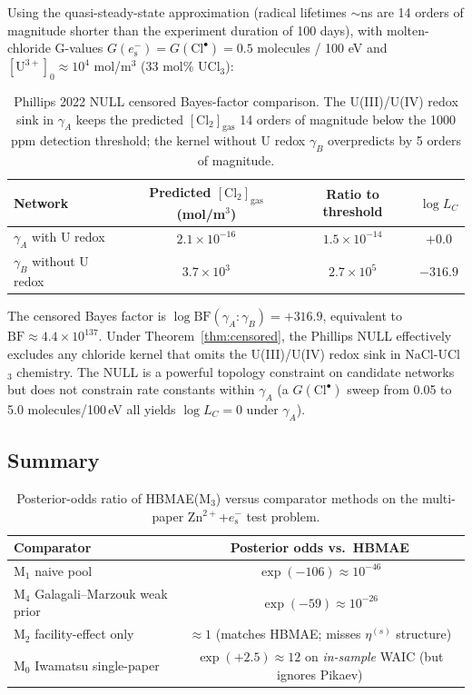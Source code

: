 \documentclass[11pt]{article}
\theoremstyle{definition}
\theoremstyle{remark}
\newcommand{\eS}{e_{\mathrm{s}}^{-}\xspace}
\newcommand{\HBMAE}{HBMAE\xspace}
\begin{document}
Using the quasi-steady-state approximation (radical lifetimes $\sim$ns are 14 orders of
magnitude shorter than the experiment duration of 100 days), with molten-chloride
G-values $G(\eS) = G(\mathrm{Cl}^\bullet) = 0.5$ molecules / 100 eV and
$[\mathrm{U}^{3+}]_0 \approx 10^4$ mol/m$^3$ (33 mol\% UCl$_3$):

\begin{table}[ht]
\centering
\caption{Phillips 2022 NULL censored Bayes-factor comparison. The U(III)/U(IV) redox
sink in $\gamma_A$ keeps the predicted $[\mathrm{Cl}_2]_{\mathrm{gas}}$ 14 orders of
magnitude below the 1000 ppm detection threshold; the kernel without U redox $\gamma_B$
overpredicts by 5 orders of magnitude.}
\label{tab:phillips_null}
\begin{tabular}{l c c c}
\toprule
Network & Predicted $[\mathrm{Cl}_2]_{\mathrm{gas}}$ (mol/m$^3$) & Ratio to threshold & $\log L_C$ \\
\midrule
$\gamma_A$ with U redox    & $2.1\times 10^{-16}$ & $1.5\times 10^{-14}$ & $+0.0$ \\
$\gamma_B$ without U redox & $3.7\times 10^{3}$   & $2.7\times 10^{5}$   & $-316.9$ \\
\bottomrule
\end{tabular}
\end{table}

The censored Bayes factor is $\log \mathrm{BF}(\gamma_A:\gamma_B) = +316.9$, equivalent
to $\mathrm{BF}\approx 4.4\times 10^{137}$. Under Theorem~\ref{thm:censored}, the
Phillips NULL effectively excludes any chloride kernel that omits the U(III)/U(IV)
redox sink in NaCl-UCl$_3$ chemistry. The NULL is a powerful topology constraint on
candidate networks but does not constrain rate constants within $\gamma_A$ (a $G(\mathrm{Cl}^\bullet)$
sweep from 0.05 to 5.0 molecules/100\,eV all yields $\log L_C = 0$ under $\gamma_A$).

\subsection{Summary}\label{sec:comparison_summary}

\begin{table}[ht]
\centering
\caption{Posterior-odds ratio of \HBMAE (M$_3$) versus comparator methods on the
multi-paper Zn$^{2+}$+$\eS$ test problem.}
\label{tab:posterior_odds}
\begin{tabular}{l c}
\toprule
Comparator & Posterior odds vs.\ \HBMAE \\
\midrule
M$_1$ naive pool                & $\exp(-106) \approx 10^{-46}$ \\
M$_4$ Galagali--Marzouk weak prior & $\exp(-59)  \approx 10^{-26}$ \\
M$_2$ facility-effect only      & $\approx 1$ (matches HBMAE; misses $\eta^{(s)}$ structure) \\
M$_0$ Iwamatsu single-paper     & $\exp(+2.5) \approx 12$ on \textit{in-sample} WAIC (but ignores Pikaev) \\
\bottomrule
\end{tabular}
\end{table}
\end{document}
